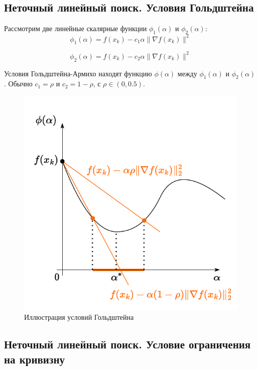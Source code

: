 \documentclass[
  russian,
  letterpaper,
  DIV=11,
  numbers=noendperiod]{scrartcl}
\begin{document}
\subsection{Неточный линейный поиск. Условия
Гольдштейна}\label{ux43dux435ux442ux43eux447ux43dux44bux439-ux43bux438ux43dux435ux439ux43dux44bux439-ux43fux43eux438ux441ux43a.-ux443ux441ux43bux43eux432ux438ux44f-ux433ux43eux43bux44cux434ux448ux442ux435ux439ux43dux430}

Рассмотрим две линейные скалярные функции \(\phi_1(\alpha)\) и
\(\phi_2(\alpha)\): \[
\phi_1(\alpha) = f(x_k) - c_1 \alpha \|\nabla f(x_k)\|^2
\]

\[
\phi_2(\alpha) = f(x_k) - c_2 \alpha \|\nabla f(x_k)\|^2
\]

Условия Гольдштейна-Армихо находят функцию \(\phi(\alpha)\) между
\(\phi_1(\alpha)\) и \(\phi_2(\alpha)\). Обычно \(c_1 = \rho\) и
\(c_2 = 1 - \rho\), с \(\rho \in (0, 0.5)\).

\begin{figure}[H]

{\centering \includegraphics[width=0.5\linewidth,height=\textheight,keepaspectratio]{Goldstein.pdf}

}

\caption{Иллюстрация условий Гольдштейна}

\end{figure}%

\subsection{Неточный линейный поиск. Условие ограничения на
кривизну}\label{ux43dux435ux442ux43eux447ux43dux44bux439-ux43bux438ux43dux435ux439ux43dux44bux439-ux43fux43eux438ux441ux43a.-ux443ux441ux43bux43eux432ux438ux435-ux43eux433ux440ux430ux43dux438ux447ux435ux43dux438ux44f-ux43dux430-ux43aux440ux438ux432ux438ux437ux43dux443}
\end{document}
